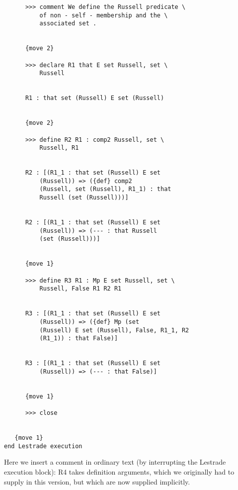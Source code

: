 \documentclass[12pt]{article}
\begin{document}
\begin{verbatim}
      >>> comment We define the Russell predicate \
          of non - self - membership and the \
          associated set .


      {move 2}

      >>> declare R1 that E set Russell, set \
          Russell


      R1 : that set (Russell) E set (Russell)


      {move 2}

      >>> define R2 R1 : comp2 Russell, set \
          Russell, R1


      R2 : [(R1_1 : that set (Russell) E set 
          (Russell)) => ({def} comp2 
          (Russell, set (Russell), R1_1) : that 
          Russell (set (Russell)))]


      R2 : [(R1_1 : that set (Russell) E set 
          (Russell)) => (--- : that Russell 
          (set (Russell)))]


      {move 1}

      >>> define R3 R1 : Mp E set Russell, set \
          Russell, False R1 R2 R1


      R3 : [(R1_1 : that set (Russell) E set 
          (Russell)) => ({def} Mp (set 
          (Russell) E set (Russell), False, R1_1, R2 
          (R1_1)) : that False)]


      R3 : [(R1_1 : that set (Russell) E set 
          (Russell)) => (--- : that False)]


      {move 1}

      >>> close


   {move 1}
end Lestrade execution

\end{verbatim}

Here we insert a comment in ordinary text (by interrupting the Lestrade execution block):  R4 takes definition arguments,
which we originally had to supply in this version, but which
are now supplied implicitly.
\end{document}
